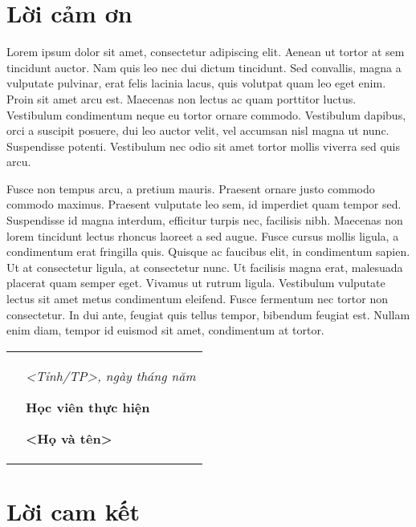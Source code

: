 \chapter*{Lời cảm ơn}

Lorem ipsum dolor sit amet, consectetur adipiscing elit. Aenean ut tortor at sem tincidunt auctor. Nam quis leo nec dui dictum tincidunt. Sed convallis, magna a vulputate pulvinar, erat felis lacinia lacus, quis volutpat quam leo eget enim. Proin sit amet arcu est. Maecenas non lectus ac quam porttitor luctus. Vestibulum condimentum neque eu tortor ornare commodo. Vestibulum dapibus, orci a suscipit posuere, dui leo auctor velit, vel accumsan nisl magna ut nunc. Suspendisse potenti. Vestibulum nec odio sit amet tortor mollis viverra sed quis arcu.\par
Fusce non tempus arcu, a pretium mauris. Praesent ornare justo commodo commodo maximus. Praesent vulputate leo sem, id imperdiet quam tempor sed. Suspendisse id magna interdum, efficitur turpis nec, facilisis nibh. Maecenas non lorem tincidunt lectus rhoncus laoreet a sed augue. Fusce cursus mollis ligula, a condimentum erat fringilla quis. Quisque ac faucibus elit, in condimentum sapien. Ut at consectetur ligula, at consectetur nunc. Ut facilisis magna erat, malesuada placerat quam semper eget. Vivamus ut rutrum ligula. Vestibulum vulputate lectus sit amet metus condimentum eleifend. Fusce fermentum nec tortor non consectetur. In dui ante, feugiat quis tellus tempor, bibendum feugiat est. Nullam enim diam, tempor id euismod sit amet, condimentum at tortor.\par
\begin{table}[!ht]\centering
	\begin{tabular}{p{.45\linewidth}p{.5\linewidth}}
	&\centering
	\textit{<Tỉnh/TP>, ngày \the\day{} tháng \the\month{} năm \the\year{}}\par
	\textbf{Học viên thực hiện}\par
	\vspace{3cm}
	\textbf{<Họ và tên>}\par
	\end{tabular}
\end{table}
\cleardoublepage

\chapter*{Lời cam kết}

